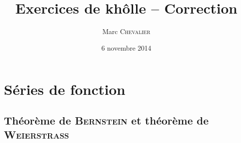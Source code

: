 

\title{Exercices de khôlle \--- Correction}
\author{Marc \textsc{Chevalier}}
\date{6 novembre 2014}


\maketitle
\setcounter{tocdepth}{2}
\tableofcontents

\section{Séries de fonction}

\subsection{Théorème de \textsc{Bernstein} et théorème de \textsc{Weierstrass}}

